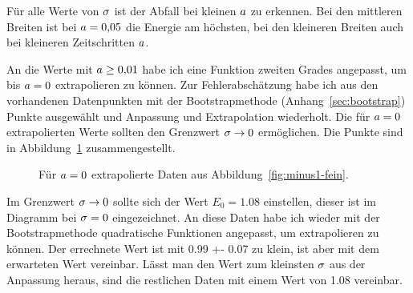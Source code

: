 Für alle Werte von $\sigma$ ist der Abfall bei kleinen $a$ zu
erkennen. Bei den mittleren Breiten ist bei $a = \num{0.05}$ die Energie
am höchsten, bei den kleineren Breiten auch bei kleineren Zeitschritten
$a$.

An die Werte mit $a \geq \num{0.01}$ habe ich eine Funktion zweiten
Grades angepasst, um bis $a = 0$ extrapolieren zu können. Zur
Fehlerabschätzung habe ich aus den vorhandenen Datenpunkten mit der
Bootstrapmethode (Anhang~\ref{sec:bootstrap}) Punkte ausgewählt und Anpassung
und Extrapolation wiederholt. Die für $a = 0$ extrapolierten Werte
sollten den Grenzwert $\sigma \to 0$ ermöglichen. Die Punkte sind in
Abbildung~\ref{fig:minus1-meta} zusammengestellt.

\begin{figure}[htbp]
    \centering
    \caption{%
        Für $a = 0$ extrapolierte Daten aus
        Abbildung~\ref{fig:minus1-fein}.
    }
    \label{fig:minus1-meta}
\end{figure}

Im Grenzwert $\sigma \to 0$ sollte sich der Wert $E_0 = \num{1.08}$
einstellen, dieser ist im Diagramm bei $\sigma = 0$ eingezeichnet. An
diese Daten habe ich wieder mit der Bootstrapmethode quadratische Funktionen
angepasst, um extrapolieren zu können. Der errechnete Wert ist mit \num{0.99 +-
0.07} zu klein, ist aber mit dem erwarteten Wert vereinbar. Lässt man den Wert
zum kleinsten $\sigma$ aus der Anpassung heraus, sind die restlichen Daten
mit einem Wert von \num{1.08} vereinbar.

